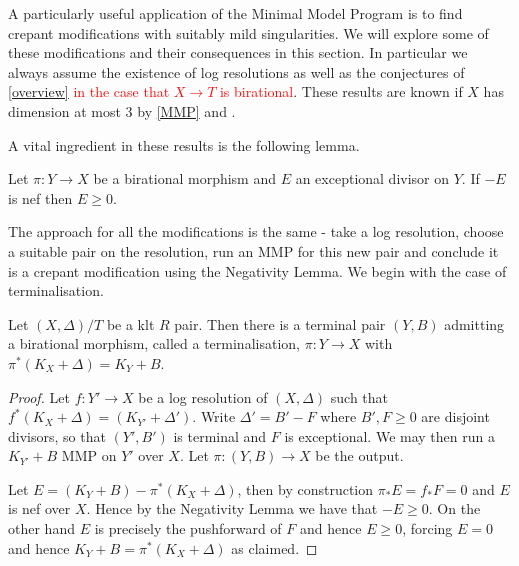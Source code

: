 \documentclass[a4paper,12pt]{book}
\newcommand\myworries[1]{\textcolor{red}{#1}}
\begin{document}
A particularly useful application of the Minimal Model Program is to find crepant modifications with suitably mild singularities. We will explore some of these modifications and their consequences in this section. In particular we always assume the existence of log resolutions as well as the conjectures of \autoref{overview} \myworries{in the case that $X \to T$ is birational}.  These results are known if $X$ has dimension at most $3$ by \autoref{MMP} and \cite{}.

A vital ingredient in these results is the following lemma.

\begin{lemma}\cite{}	
	Let $\pi:Y \to X$ be a birational morphism and $E$ an exceptional divisor on $Y$. If $-E$ is nef then $E \geq 0$.

	\end{lemma}

The approach for all the modifications is the same - take a log resolution, choose a suitable pair on the resolution, run an MMP for this new pair and conclude it is a crepant modification using the Negativity Lemma. We begin with the case of terminalisation.


\begin{lemma}
	
	Let $(X,\Delta)/T$ be a klt $R$ pair. Then there is a terminal pair $(Y,B)$ admitting a birational morphism, called a terminalisation, $\pi:Y \to X$ with $\pi^{*}(K_{X}+\Delta)=K_{Y}+B$.
	
	\end{lemma}



\begin{proof}
	
	Let $f:Y' \to X$ be a log resolution of $(X,\Delta)$ such that $f^{*}(K_{X}+\Delta)=(K_{Y'}+\Delta')$. Write $\Delta'=B'-F$ where $B',F \geq 0$ are disjoint divisors, so that $(Y',B')$ is terminal and $F$ is exceptional. We may then run a $K_{Y'}+B$ MMP on $Y'$ over $X$. Let $\pi:(Y,B) \to X$ be the output. 
	
	Let $E=(K_{Y}+B)-\pi^{*}(K_{X}+\Delta)$, then by construction $\pi_{*}E=f_{*}F=0$ and $E$ is nef over $X$. Hence by the Negativity Lemma we have that $-E \geq 0$. On the other hand $E$ is precisely the pushforward of $F$ and hence $E \geq 0$, forcing $E=0$ and hence $K_{Y}+B=\pi^{*}(K_{X}+\Delta)$ as claimed.

\end{proof}
\end{document}
